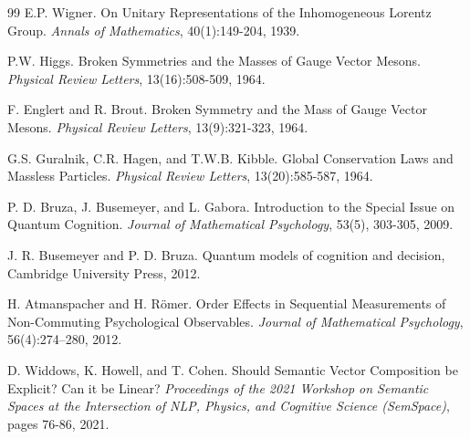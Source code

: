 \documentclass[prd,amsmath,amssymb,12pt]{revtex4}
\begin{document}
\begin{thebibliography}{99}
    E.P. Wigner.
    On Unitary Representations of the Inhomogeneous Lorentz Group.
    {\em Annals of Mathematics}, 40(1):149-204, 1939.

    P.W. Higgs.
    Broken Symmetries and the Masses of Gauge Vector Mesons.
    {\em Physical Review Letters}, 13(16):508-509, 1964.

    F. Englert and R. Brout.
    Broken Symmetry and the Mass of Gauge Vector Mesons.
    {\em Physical Review Letters}, 13(9):321-323, 1964.

    G.S. Guralnik, C.R. Hagen, and T.W.B. Kibble.
    Global Conservation Laws and Massless Particles.
    {\em Physical Review Letters}, 13(20):585-587, 1964.

    P. D. Bruza, J. Busemeyer, and L. Gabora.
    Introduction to the Special Issue on Quantum Cognition.
    {\em Journal of Mathematical Psychology}, 53(5), 303-305, 2009.

    J. R. Busemeyer and P. D. Bruza.
    Quantum models of cognition and decision, Cambridge University Press, 2012.

    H. Atmanspacher and H. Römer.
    Order Effects in Sequential Measurements of Non-Commuting Psychological Observables.
    {\em Journal of Mathematical Psychology}, 56(4):274--280, 2012.

    D. Widdows, K. Howell, and T. Cohen.
    Should Semantic Vector Composition be Explicit? Can it be Linear?
    {\em Proceedings of the 2021 Workshop on Semantic Spaces at the Intersection of NLP,
    Physics, and Cognitive Science (SemSpace)}, pages 76-86, 2021.

\end{thebibliography}
\end{document}
